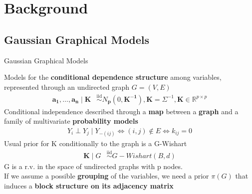 

\section{Background}
\newcommand{\iid}{\overset{\mathrm{iid}}{\sim}}
\newcommand{\ind}{\overset{\mathrm{ind}}{\sim}}

\subsection{Gaussian Graphical Models}
\begin{frame}{Gaussian Graphical Models}

    Models for the \textbf{conditional dependence structure} among variables, represented through an undirected graph $G=(V,E)$
    \begin{align*}
    \mathbf{a_{1}}, \ldots, \mathbf{a_{n}} \mid \mathbf{K} &\iid N_\mathbf{{p}}(0,\mathbf{K^{-1}}), \mathbf{K}=\Sigma^{-1}, \mathbf{K} \in \mathbb{R}^{p\times p}  %
    \end{align*}
Conditional independence described through a \textbf{map} between a \textbf{graph} and a family of multivariate \textbf{probability models}
\begin{align*}
Y_{i}\perp Y_{j} \mid Y_{-(ij)}\Leftrightarrow (i,j) \notin E \Leftrightarrow k_{ij}=0
\end{align*}
Usual prior for K conditionally to the graph is a G-Wishart
\centering
\begin{align*}
    \mathbf{K} \mid G &\iid G-Wishart(B,d)
\end{align*}
G is a r.v. in the space of undirected graphs with p nodes.\\
If we assume a possible \textbf{grouping} of the variables, we need a prior $\pi(G)$ that induces a \textbf{block structure on its adjacency matrix}

\end{frame}



 

